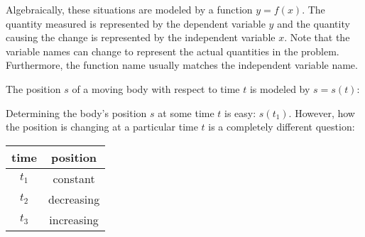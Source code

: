 \documentclass[letterpaper,12pt,fleqn]{article}
\begin{document}
Algebraically, these situations are modeled by a function \(y=f(x)\).  The quantity measured is represented by the
dependent variable \(y\) and the quantity causing the change is represented by the independent variable \(x\).
Note that the variable names can change to represent the actual quantities in the problem.  Furthermore, the
function name usually matches the independent variable name.

\newpage

\begin{example}

  The position \(s\) of a moving body with respect to time \(t\) is modeled by \(s=s(t)\):

  \bigskip

  \begin{center}
  \end{center}

  Determining the body's position \(s\) at some time \(t\) is easy: \(s(t_1)\).  However, how the position is
  changing at a particular time \(t\) is a completely different question:

  \bigskip

  \begin{center}
    \begin{tabular}{|c|c|}
      \hline
      time & position \\
      \hline
      \hline
      \(t_1\) & constant \\
      \hline
      \(t_2\) & decreasing \\
      \hline
      \(t_3\) & increasing \\
      \hline
    \end{tabular}
  \end{center}
\end{example}
\end{document}
